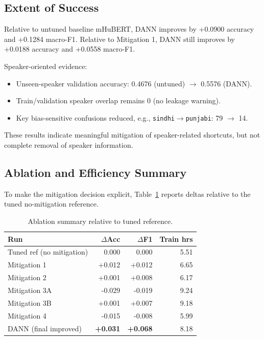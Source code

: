 \documentclass[11pt]{article}
\begin{document}
\subsection{Extent of Success}
Relative to untuned baseline mHuBERT, DANN improves by +0.0900 accuracy and +0.1284 macro-F1. Relative to Mitigation 1, DANN still improves by +0.0188 accuracy and +0.0558 macro-F1.

Speaker-oriented evidence:
\begin{itemize}
    \item Unseen-speaker validation accuracy: 0.4676 (untuned) $\rightarrow$ 0.5576 (DANN).
    \item Train/validation speaker overlap remains 0 (no leakage warning).
    \item Key bias-sensitive confusions reduced, e.g., \texttt{sindhi$\rightarrow$punjabi}: 79 $\rightarrow$ 14.
\end{itemize}

These results indicate meaningful mitigation of speaker-related shortcuts, but not complete removal of speaker information.

\subsection{Ablation and Efficiency Summary}
To make the mitigation decision explicit, Table~\ref{tab:ablation-efficiency} reports deltas relative to the tuned no-mitigation reference.

\begin{table}[t]
\centering
\small
\setlength{\tabcolsep}{2.5pt}
\begin{tabular}{@{}p{}rrr@{}}
\toprule
Run & $\Delta$Acc & $\Delta$F1 & Train hrs \\
\midrule
Tuned ref (no mitigation) & 0.000 & 0.000 & 5.51 \\
Mitigation 1 & +0.012 & +0.012 & 6.65 \\
Mitigation 2 & +0.001 & +0.008 & 6.17 \\
Mitigation 3A & -0.029 & -0.019 & 9.24 \\
Mitigation 3B & +0.001 & +0.007 & 9.18 \\
Mitigation 4 & -0.015 & -0.008 & 5.99 \\
DANN (final improved) & \textbf{+0.031} & \textbf{+0.068} & 8.18 \\
\bottomrule
\end{tabular}
\caption{Ablation summary relative to tuned reference.}
\label{tab:ablation-efficiency}
\end{table}
\end{document}
